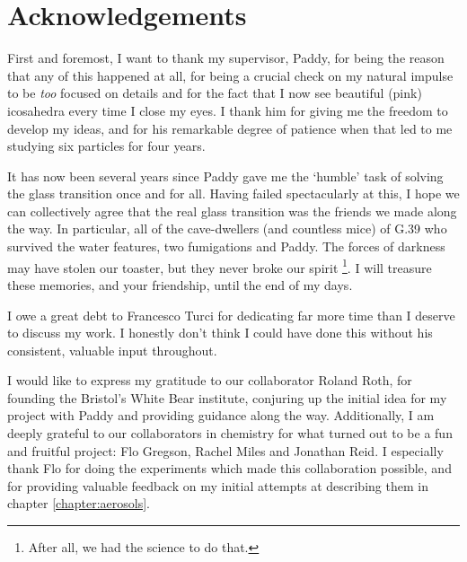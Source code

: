 
\chapter*{\vspace{-1em} Acknowledgements}

First and foremost, I want to thank my supervisor, Paddy, for being the reason that any of this happened at all, for being a crucial check on my natural impulse to be \emph{too} focused on details and for the fact that I now see beautiful (pink) icosahedra every time I close my eyes.
I thank him for giving me the freedom to develop my ideas, and for his remarkable degree of patience when that led to me studying six particles for four years.

It has now been several years since Paddy gave me the `humble' task of solving the glass transition once and for all.
Having failed spectacularly at this, I hope we can collectively agree that the real glass transition was the friends we made along the way.
In particular, all of the cave-dwellers (and countless mice) of G.39 who survived the water features, two fumigations and Paddy.
The forces of darkness may have stolen our toaster, but they never broke our spirit%
\footnote{After all, we had the science to do that.}.
I will treasure these memories, and your friendship, until the end of my days.

I owe a great debt to Francesco Turci for dedicating far more time than I deserve to discuss my work.
I honestly don't think I could have done this without his consistent, valuable input throughout.

I would like to express my gratitude to our collaborator Roland Roth, for founding the Bristol's White Bear institute, conjuring up the initial idea for my project with Paddy and providing guidance along the way.
Additionally, I am deeply grateful to our collaborators in chemistry for what turned out to be a fun and fruitful project: Flo Gregson, Rachel Miles and Jonathan Reid.
I especially thank Flo for doing the experiments which made this collaboration possible, and for providing valuable feedback on my initial attempts at describing them in chapter \ref{chapter:aerosols}.

